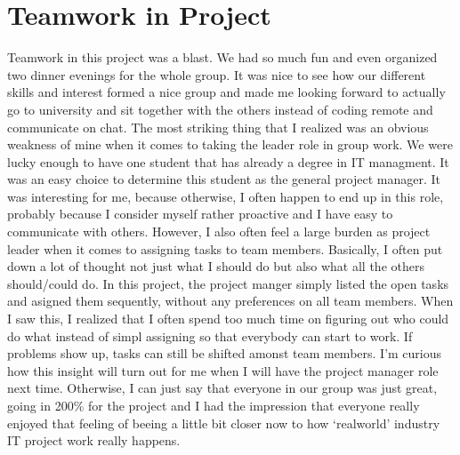 \documentclass[a4paper,11pt,twoside]{article}
\begin{document}
\section{Teamwork in Project}
Teamwork in this project was a blast. We had so much fun and even organized two dinner evenings for the whole group. It was nice to see how our different skills and interest formed a nice group and made me looking forward to actually go to university and sit together with the others instead of coding remote and communicate on chat.
The most striking thing that I realized was an obvious weakness of mine when it comes to taking the leader role in group work. We were lucky enough to have one student that has already a degree in IT managment. It was an easy choice to determine this student as the general project manager. It was interesting for me, because otherwise, I often happen to end up in this role, probably because I consider myself rather proactive and I have easy to communicate with others. However, I also often feel a large burden as project leader when it comes to assigning tasks to team members. Basically, I often put down a lot of thought not just what I should do but also what all the others should/could do. In this project, the project manger simply listed the open tasks and asigned them sequently, without any preferences on all team members. When I saw this, I realized that I often spend too much time on figuring out who could do what instead of simpl assigning so that everybody can start to work. If problems show up, tasks can still be shifted amonst team members. I'm curious how this insight will turn out for me when I will have the project manager role next time.
Otherwise, I can just say that everyone in our group was just great, going in 200\% for the project and I had the impression that everyone really enjoyed that feeling of beeing a little bit closer now to how `realworld' industry IT project work really happens.  
\end{document}
